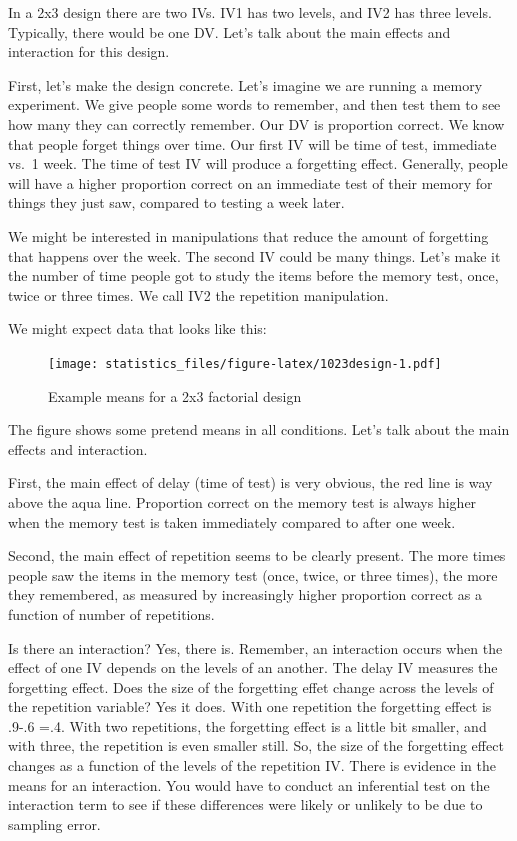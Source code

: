\documentclass[]{book}
\begin{document}
In a 2x3 design there are two IVs. IV1 has two levels, and IV2 has three levels. Typically, there would be one DV. Let's talk about the main effects and interaction for this design.

First, let's make the design concrete. Let's imagine we are running a memory experiment. We give people some words to remember, and then test them to see how many they can correctly remember. Our DV is proportion correct. We know that people forget things over time. Our first IV will be time of test, immediate vs.~1 week. The time of test IV will produce a forgetting effect. Generally, people will have a higher proportion correct on an immediate test of their memory for things they just saw, compared to testing a week later.

We might be interested in manipulations that reduce the amount of forgetting that happens over the week. The second IV could be many things. Let's make it the number of time people got to study the items before the memory test, once, twice or three times. We call IV2 the repetition manipulation.

We might expect data that looks like this:

\begin{figure}
\centering
\texttt{[image: statistics\_files/figure-latex/1023design-1.pdf]}
\caption{\label{fig:1023design}Example means for a 2x3 factorial design}
\end{figure}

The figure shows some pretend means in all conditions. Let's talk about the main effects and interaction.

First, the main effect of delay (time of test) is very obvious, the red line is way above the aqua line. Proportion correct on the memory test is always higher when the memory test is taken immediately compared to after one week.

Second, the main effect of repetition seems to be clearly present. The more times people saw the items in the memory test (once, twice, or three times), the more they remembered, as measured by increasingly higher proportion correct as a function of number of repetitions.

Is there an interaction? Yes, there is. Remember, an interaction occurs when the effect of one IV depends on the levels of an another. The delay IV measures the forgetting effect. Does the size of the forgetting effet change across the levels of the repetition variable? Yes it does. With one repetition the forgetting effect is .9-.6 =.4. With two repetitions, the forgetting effect is a little bit smaller, and with three, the repetition is even smaller still. So, the size of the forgetting effect changes as a function of the levels of the repetition IV. There is evidence in the means for an interaction. You would have to conduct an inferential test on the interaction term to see if these differences were likely or unlikely to be due to sampling error.
\end{document}

